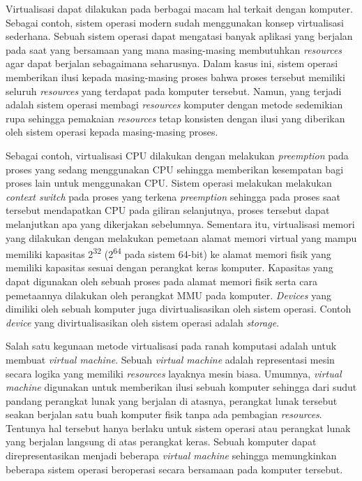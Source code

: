 Virtualisasi dapat dilakukan pada berbagai macam hal terkait dengan komputer.
Sebagai contoh, sistem operasi modern sudah menggunakan konsep virtualisasi sederhana.
Sebuah sistem operasi dapat mengatasi banyak aplikasi yang berjalan pada saat yang bersamaan yang mana masing-masing membutuhkan \textit{resources} agar dapat berjalan sebagaimana seharusnya.
Dalam kasus ini, sistem operasi memberikan ilusi kepada masing-masing proses bahwa proses tersebut memiliki seluruh \textit{resources} yang terdapat pada komputer tersebut.
Namun, yang terjadi adalah sistem operasi membagi \textit{resources} komputer dengan metode sedemikian rupa sehingga pemakaian \textit{resources} tetap konsisten dengan ilusi yang diberikan oleh sistem operasi kepada masing-masing proses.

Sebagai contoh, virtualisasi CPU dilakukan dengan melakukan \textit{preemption} pada proses yang sedang menggunakan CPU sehingga memberikan kesempatan bagi proses lain untuk menggunakan CPU.
Sistem operasi melakukan melakukan \textit{context switch} pada proses yang terkena \textit{preemption} sehingga pada proses saat tersebut mendapatkan CPU pada giliran selanjutnya, proses tersebut dapat melanjutkan apa yang dikerjakan sebelumnya.
Sementara itu, virtualisasi memori yang dilakukan dengan melakukan pemetaan alamat memori virtual yang mampu memiliki kapasitas 2\textsuperscript{32} (2\textsuperscript{64} pada sistem 64-bit) ke alamat memori fisik yang memiliki kapasitas sesuai dengan perangkat keras komputer.
Kapasitas yang dapat digunakan oleh sebuah proses pada alamat memori fisik serta cara pemetaannya dilakukan oleh perangkat MMU pada komputer.
\textit{Devices} yang dimiliki oleh sebuah komputer juga divirtualisasikan oleh sistem operasi.
Contoh \textit{device} yang divirtualisasikan oleh sistem operasi adalah \textit{storage}.

Salah satu kegunaan metode virtualisasi pada ranah komputasi adalah untuk membuat \textit{virtual machine}.
Sebuah \textit{virtual machine} adalah representasi mesin secara logika yang memiliki \textit{resources} layaknya mesin biasa.
Umumnya, \textit{virtual machine} digunakan untuk memberikan ilusi sebuah komputer sehingga dari sudut pandang perangkat lunak yang berjalan di atasnya, perangkat lunak tersebut seakan berjalan satu buah komputer fisik tanpa ada pembagian \textit{resources}.
Tentunya hal tersebut hanya berlaku untuk sistem operasi atau perangkat lunak yang berjalan langsung di atas perangkat keras.
Sebuah komputer dapat direpresentasikan menjadi beberapa \textit{virtual machine} sehingga memungkinkan beberapa sistem operasi beroperasi secara bersamaan pada komputer tersebut.

